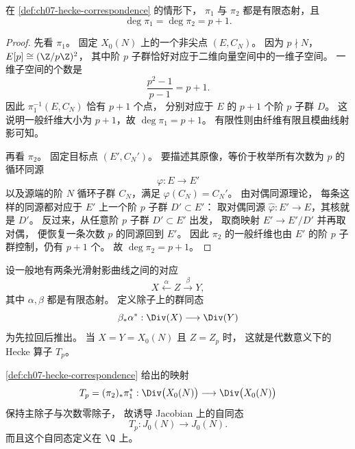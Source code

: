 \begin{proposition}[两个投影的次数都是 $p+1$]
\label{prop:ch07-hecke-degree-p-plus-1}
在 \cref{def:ch07-hecke-correspondence} 的情形下，
$\pi_1$ 与 $\pi_2$ 都是有限态射，且
\[
  \deg \pi_1=\deg \pi_2=p+1.
\]
\end{proposition}

\begin{proof}
先看 $\pi_1$。
固定 $X_0(N)$ 上的一个非尖点 $(E,C_N)$。
因为 $p\nmid N$，
$E[p]\cong (\Z/p\Z)^2$，
其中阶 $p$ 子群恰好对应于二维向量空间中的一维子空间。
一维子空间的个数是
\[
  \frac{p^2-1}{p-1}=p+1.
\]
因此 $\pi_1^{-1}(E,C_N)$ 恰有 $p+1$ 个点，
分别对应于 $E$ 的 $p+1$ 个阶 $p$ 子群 $D$。
这说明一般纤维大小为 $p+1$，故 $\deg\pi_1=p+1$。
有限性则由纤维有限且模曲线射影可知。

再看 $\pi_2$。
固定目标点 $(E',C_N')$。
要描述其原像，等价于枚举所有次数为 $p$ 的循环同源
\[
  \varphi:E\to E'
\]
以及源端的阶 $N$ 循环子群 $C_N$，满足 $\varphi(C_N)=C_N'$。
由对偶同源理论，
每条这样的同源都对应于 $E'$ 上一个阶 $p$ 子群 $D'\subset E'$：
取对偶同源 $\widehat\varphi:E'\to E$，其核就是 $D'$。
反过来，从任意阶 $p$ 子群 $D'\subset E'$ 出发，
取商映射 $E'\to E'/D'$ 并再取对偶，
便恢复一条次数 $p$ 的同源回到 $E'$。
因此 $\pi_2$ 的一般纤维也由 $E'$ 的阶 $p$ 子群控制，仍有 $p+1$ 个。
故 $\deg\pi_2=p+1$。
\end{proof}

\begin{definition}[对应诱导的除子映射]
\label{def:ch07-correspondence-on-divisors}
设一般地有两条光滑射影曲线之间的对应
\[
  X\xleftarrow{\alpha} Z\xrightarrow{\beta} Y,
\]
其中 $\alpha,\beta$ 都是有限态射。
定义除子上的群同态
\[
  \beta_*\alpha^*:\Div(X)\longrightarrow \Div(Y)
\]
为先拉回后推出。
当 $X=Y=X_0(N)$ 且 $Z=Z_p$ 时，
这就是代数意义下的 Hecke 算子 $T_p$。
\end{definition}

\begin{proposition}
\label{prop:ch07-hecke-on-jacobian}
\cref{def:ch07-hecke-correspondence} 给出的映射
\[
  T_p=(\pi_2)_*\pi_1^*:
  \Div\bigl(X_0(N)\bigr)\longrightarrow \Div\bigl(X_0(N)\bigr)
\]
保持主除子与次数零除子，
故诱导 Jacobian 上的自同态
\[
  T_p:J_0(N)\longrightarrow J_0(N).
\]
而且这个自同态定义在 $\Q$ 上。
\end{proposition}


